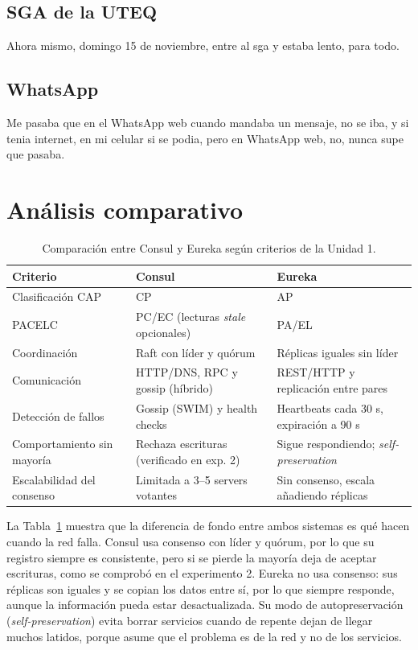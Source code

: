 \documentclass[12pt,a4paper]{article}
\begin{document}
\subsection{SGA de la UTEQ}
Ahora mismo, domingo 15 de noviembre, entre al sga y estaba lento, para todo.

\subsection{WhatsApp}
Me pasaba que en el WhatsApp web cuando mandaba un mensaje, no se iba, y si tenia internet, en mi celular si se podia, pero en WhatsApp web, no, nunca supe que pasaba.


\section{Análisis comparativo}

\begin{table}[H]
  \centering
  \caption{Comparación entre Consul y Eureka según criterios de la Unidad 1.}
  \label{tab:comparacion}
  \begin{tabularx}{\textwidth}{>{\raggedright\arraybackslash}p{3.2cm}XX}
    \toprule
    \textbf{Criterio} & \textbf{Consul} & \textbf{Eureka} \\
    \midrule
    Clasificación CAP & CP & AP \\
    PACELC & PC/EC (lecturas \textit{stale} opcionales) & PA/EL \\
    Coordinación & Raft con líder y quórum & Réplicas iguales sin líder \\
    Comunicación & HTTP/DNS, RPC y gossip (híbrido) & REST/HTTP y replicación entre pares \\
    Detección de fallos & Gossip (SWIM) y health checks & Heartbeats cada 30 s, expiración a 90 s \\
    Comportamiento sin mayoría & Rechaza escrituras (verificado en exp. 2) & Sigue respondiendo; \textit{self-preservation} \\
    Escalabilidad del consenso & Limitada a 3--5 servers votantes & Sin consenso, escala añadiendo réplicas \\
    \bottomrule
  \end{tabularx}
\end{table}

La Tabla~\ref{tab:comparacion} muestra que la diferencia de fondo entre ambos sistemas es qué hacen cuando la red falla. Consul usa consenso con líder y quórum, por lo que su registro siempre es consistente, pero si se pierde la mayoría deja de aceptar escrituras, como se comprobó en el experimento 2. Eureka no usa consenso: sus réplicas son iguales y se copian los datos entre sí, por lo que siempre responde, aunque la información pueda estar desactualizada. Su modo de autopreservación (\textit{self-preservation}) evita borrar servicios cuando de repente dejan de llegar muchos latidos, porque asume que el problema es de la red y no de los servicios.
\end{document}
